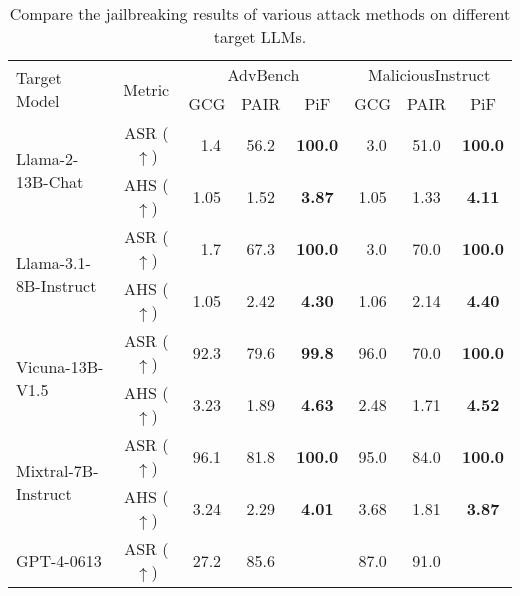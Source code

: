 \begin{table*}[t]
\setlength{\tabcolsep}{9.5pt} %
\fontsize{9.5}{10.}\selectfont
\caption{Compare the jailbreaking results of various attack methods on different target LLMs.}
\vspace{-0.7em}
\label{table:2}
\centering
  \begin{tabular}{l c c c c | c c c}
    \toprule
    \toprule
     \multirow{2}{*}{\vspace{-0.6em}Target Model} & \multirow{2}{*}{\vspace{-0.6em}Metric} & \multicolumn{3}{c}{AdvBench} & \multicolumn{3}{|c}{MaliciousInstruct}\\
    \cmidrule(l{1pt}r{1pt}){3-5}
    \cmidrule(l{1pt}r{1pt}){6-8}
     & & GCG & PAIR & {PiF} & GCG & PAIR & {PiF} \\
    \midrule
    \multirow{2}{*}{Llama-2-13B-Chat} & {ASR ($\uparrow$)} & \,\,\,1.4  & 56.2 & 
    \cellcolor{SelfColor!15}\textbf{100.0} & \,\,\,3.0 & 51.0 & \cellcolor{SelfColor!15}\textbf{100.0}\\
     & {AHS ($\uparrow$)} & 1.05 & 1.52 & \cellcolor{SelfColor!15}\textbf{3.87} & 1.05 & 1.33 & \cellcolor{SelfColor!15}\textbf{4.11}\\
    \midrule
    \multirow{2}{*}{Llama-3.1-8B-Instruct} & {ASR ($\uparrow$)} & \,\,\,1.7 & 67.3 & \cellcolor{SelfColor!15}\textbf{100.0} & \,\,\,3.0 & 70.0 & \cellcolor{SelfColor!15}\textbf{100.0}\\
     & {AHS ($\uparrow$)} & 1.05 & 2.42 & \cellcolor{SelfColor!15}\textbf{4.30} & 1.06 & 2.14 & \cellcolor{SelfColor!15}\textbf{4.40}\\
        \midrule
    \multirow{2}{*}{Vicuna-13B-V1.5} & {ASR ($\uparrow$)} &92.3  & 79.6 & \cellcolor{SelfColor!15}\textbf{99.8} &  96.0& 70.0 & \cellcolor{SelfColor!15}\textbf{100.0}\\
     & {AHS ($\uparrow$)} & 3.23 & 1.89 & \cellcolor{SelfColor!15}\textbf{4.63} & 2.48 & 1.71 & \cellcolor{SelfColor!15}\textbf{4.52}\\
    \midrule
    \multirow{2}{*}{Mixtral-7B-Instruct} & {ASR ($\uparrow$)} & 96.1  & 81.8 & \cellcolor{SelfColor!15}\textbf{100.0}& 95.0  & 84.0 & \cellcolor{SelfColor!15}\textbf{100.0}\\
     & {AHS ($\uparrow$)} & 3.24 & 2.29 & \cellcolor{SelfColor!15}\textbf{4.01} & 3.68 & 1.81 & \cellcolor{SelfColor!15}\textbf{3.87}\\ 
    \midrule
    \multirow{2}{*}{GPT-4-0613} & {ASR ($\uparrow$)} & 27.2 & {85.6} & \cellcolor{SelfColor!15}{\textbf{97.7}} & 87.0 & {91.0} & \cellcolor{SelfColor!15}{\textbf{100.0}} \\

\end{tabular}
\end{table*}
